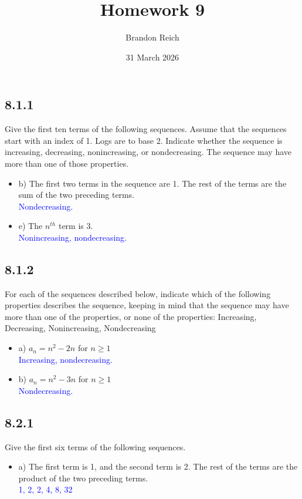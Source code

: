 \documentclass{article}
\title{Homework 9}
\author{Brandon Reich}
\date{31 March 2026}
\begin{document}
\maketitle

\subsection*{8.1.1}
Give the first ten terms of the following sequences. Assume that the sequences start with an index of 1. Logs are to base 2. Indicate whether the sequence is increasing, decreasing, nonincreasing, or nondecreasing. The sequence may have more than one of those properties.
\begin{itemize}
    \item b) The first two terms in the sequence are 1. The rest of the terms are the sum of the two preceding terms. \\
    \textcolor{blue}{Nondecreasing.}
    \item e) The $n^{th}$ term is 3. \\
    \textcolor{blue}{Nonincreasing, nondecreasing.}
\end{itemize}

\subsection*{8.1.2}
For each of the sequences described below, indicate which of the following properties describes the sequence, keeping in mind that the sequence may have more than one of the properties, or none of the properties: Increasing, Decreasing, Nonincreasing, Nondecreasing
\begin{itemize}
    \item a) $a_n = n^2 - 2n$ for $n \ge 1$ \\
    \textcolor{blue}{Increasing, nondecreasing.}
    \item b) $a_n = n^2 -3n$ for $n \ge 1$ \\
    \textcolor{blue}{Nondecreasing.}
\end{itemize}

\subsection*{8.2.1}
Give the first six terms of the following sequences.
\begin{itemize}
    \item a) The first term is 1, and the second term is 2. The rest of the terms are the product of the two preceding terms. \\
    \textcolor{blue}{1, 2, 2, 4, 8, 32}
\end{itemize}
\end{document}
